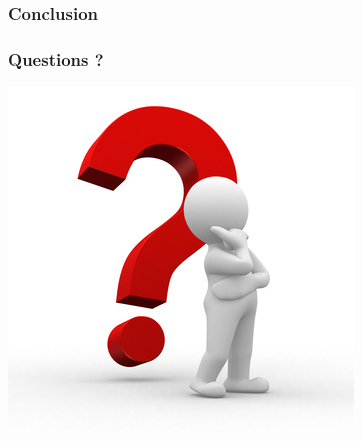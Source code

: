 \documentclass{beamer}
\begin{document}
\begin{frame}
\frametitle{Conclusion}

\end{frame}



\begin{frame}
\frametitle{Questions ?}

\begin{center}
\includegraphics[scale=0.5]{includes/questions.jpg}
\end{center}


\end{frame}
\end{document}
